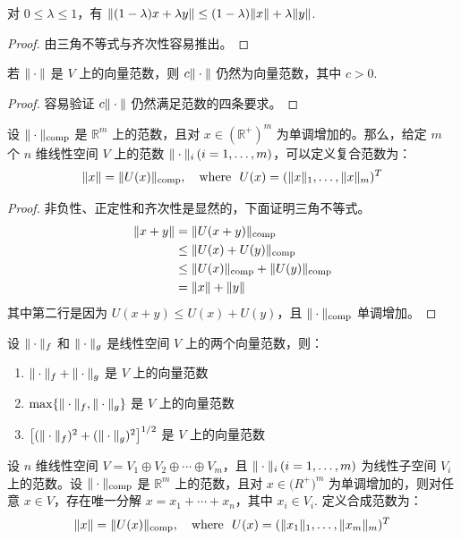 \begin{theorem}[范数是凸函数]
对 $0\leq\lambda\leq1$，有 $\Vert(1-\lambda)x+\lambda y\Vert\leq(1-\lambda)\Vert x\Vert+\lambda\Vert y\Vert$.
\end{theorem}
\begin{proof}
由三角不等式与齐次性容易推出。
\end{proof}

\begin{theorem}[范数的乘法]
若 $\Vert\cdot\Vert$ 是 $V$ 上的向量范数，则 $c\Vert\cdot\Vert$ 仍然为向量范数，其中 $c>0$.
\end{theorem}
\begin{proof}
容易验证 $c\Vert\cdot\Vert$ 仍然满足范数的四条要求。
\end{proof}

\begin{theorem}[范数的复合]
设 $\Vert\cdot\Vert_\text{comp}$ 是 $\mathbb R^m$ 上的范数，且对 $x\in(\mathbb R^+)^m$ 为单调增加的。那么，给定 $m$ 个 $n$ 维线性空间 $V$ 上的范数 $\Vert\cdot\Vert_i\,(i=1,\ldots,m)$，可以定义复合范数为：
\[
    \Vert x\Vert=\Vert U(x)\Vert_\text{comp},\quad \text{where }\ U(x)=(\Vert x\Vert_1,\ldots,\Vert x\Vert_m)^T
\]
\end{theorem}
\begin{proof}
非负性、正定性和齐次性是显然的，下面证明三角不等式。
\begin{align*}
    \Vert x+y\Vert&=\Vert U(x+y)\Vert_\text{comp}\\
    &\leq\Vert U(x)+U(y)\Vert_\text{comp}\\
    &\leq\Vert U(x)\Vert_\text{comp}+\Vert U(y)\Vert_\text{comp}\\
    &=\Vert x\Vert+\Vert y\Vert
\end{align*}
其中第二行是因为 $U(x+y)\leq U(x)+U(y)$，且 $\Vert\cdot\Vert_\text{comp}$ 单调增加。
\end{proof}

\begin{example}
设 $\Vert\cdot\Vert_f$ 和 $\Vert\cdot\Vert_g$ 是线性空间 $V$ 上的两个向量范数，则：
\begin{enumerate}
    \item $\Vert\cdot\Vert_f+\Vert\cdot\Vert_g$ 是 $V$ 上的向量范数
    \item $\max\{\Vert\cdot\Vert_f,\Vert\cdot\Vert_g\}$ 是 $V$ 上的向量范数
    \item $\left[(\Vert\cdot\Vert_f)^2+(\Vert\cdot\Vert_g)^2\right]^{1/2}$ 是 $V$ 上的向量范数
\end{enumerate}
\end{example}

\begin{theorem}[范数的合成]
设 $n$ 维线性空间 $V=V_1\oplus V_2\oplus\cdots\oplus V_m$，且 $\Vert\cdot\Vert_i\,(i=1,\ldots,m)$ 为线性子空间 $V_i$ 上的范数。设 $\Vert\cdot\Vert_\text{comp}$ 是 $\mathbb R^m$ 上的范数，且对 $x\in\mathbb (R^+)^m$ 为单调增加的，则对任意 $x\in V$，存在唯一分解 $x=x_1+\cdots+x_n$，其中 $x_i\in V_i$.  定义合成范数为：  
\[
    \norm x=\norm{U(x)}_\text{comp},\quad\text{where }\ U(x)=(\norm{x_1}_1,\ldots,\norm{x_m}_m)^T
\]
\end{theorem}

